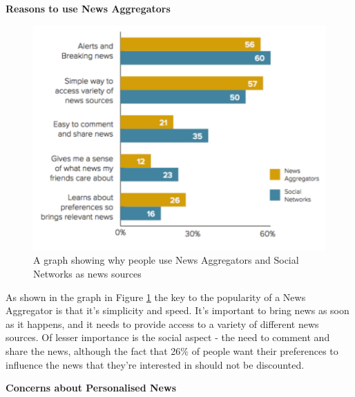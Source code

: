 \documentclass[12pt]{article}
\begin{document}
\textbf{Reasons to use News Aggregators}

\begin{figure}[h]
  \centering
    \includegraphics[scale=0.6]{WhySocialAggregatedNews.png}
   \caption[Why people use News Aggregators]{A graph showing why people use News Aggregators and Social Networks as news sources}
   \label{WhySocialAggregatedNews}
\end{figure}

As shown in the graph in Figure \ref{WhySocialAggregatedNews} the key to the popularity of a News Aggregator is that it's simplicity and speed. It's important to bring news as soon as it happens, and it needs to provide access to a variety of different news sources. Of lesser importance is the social aspect - the need to comment and share the news, although the fact that 26\% of people want their preferences to influence the news that they're interested in should not be discounted.

\textbf{Concerns about Personalised News}
\end{document}

